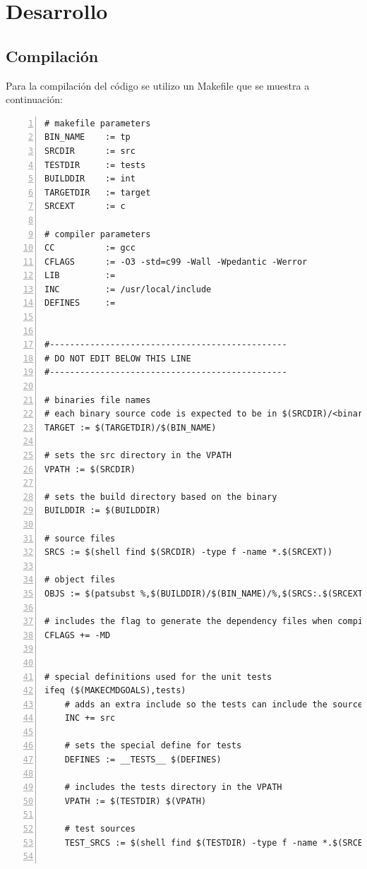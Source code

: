\chapter{Desarrollo}\label{ch:ch2label}

\section{Compilaci\'on}

Para la compilaci\'on del c\'odigo se utilizo un Makefile que se muestra a continuaci\'on:

\begin{tiny}

\begin{lstlisting}[numbers=left, tabsize=2, basicstyle=\fontsize{11}{13}\ttfamily, frame=single, caption={makefile}]
# makefile parameters
BIN_NAME    := tp
SRCDIR      := src
TESTDIR     := tests
BUILDDIR    := int
TARGETDIR   := target
SRCEXT      := c

# compiler parameters
CC          := gcc
CFLAGS      := -O3 -std=c99 -Wall -Wpedantic -Werror
LIB         :=
INC         := /usr/local/include
DEFINES     :=


#-----------------------------------------------
# DO NOT EDIT BELOW THIS LINE
#-----------------------------------------------

# binaries file names
# each binary source code is expected to be in $(SRCDIR)/<binary>
TARGET := $(TARGETDIR)/$(BIN_NAME)

# sets the src directory in the VPATH
VPATH := $(SRCDIR)

# sets the build directory based on the binary
BUILDDIR := $(BUILDDIR)

# source files
SRCS := $(shell find $(SRCDIR) -type f -name *.$(SRCEXT))

# object files
OBJS := $(patsubst %,$(BUILDDIR)/$(BIN_NAME)/%,$(SRCS:.$(SRCEXT)=.o))

# includes the flag to generate the dependency files when compiling
CFLAGS += -MD


# special definitions used for the unit tests
ifeq ($(MAKECMDGOALS),tests)
    # adds an extra include so the tests can include the sources
	INC += src

	# sets the special define for tests
	DEFINES := __TESTS__ $(DEFINES)

	# includes the tests directory in the VPATH
	VPATH := $(TESTDIR) $(VPATH)

	# test sources
	TEST_SRCS := $(shell find $(TESTDIR) -type f -name *.$(SRCEXT))


\end{lstlisting}
\end{tiny}
